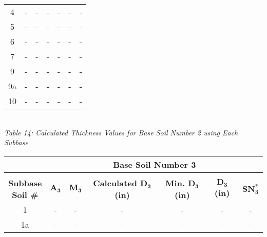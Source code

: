 \documentclass{article}
\begin{document}
\begin{center}
\begin{spacing}{1.6}
\begin{tabular}{|c|cccccc|}
                                            4       & -     & -    & -    & -                    & -              & -               \\
                                            5       & -     & -    & -    & -                    & -              & -               \\
                                            6       & -     & -    & -    & -                    & -              & -               \\
                                            7       & -     & -    & -    & -                    & -              & -               \\
                                            9       & -     & -    & -    & -                    & -              & -               \\
                                            9a      & -     & -    & -    & -                    & -              & -               \\
                                            10      & -     & -    & -    & -                    & -              & -               \\\hline
        \end{tabular}
        \vspace{3mm}
        \emph{\\Table 14: Calculated Thickness Values for Base Soil Number 2 using Each Subbase\\}
        \newpage
        \begin{tabular}{|c|cccccc|}
            \hline    
            \multicolumn{1}{|l}{}                     & \multicolumn{6}{c|}{\textbf{Base Soil Number 3}}                                              \\\hline
            &&&&&&\\
             \shortstack[c]{\textbf{Subbase}\\\textbf{Soil \#}} & $\bm{A_3}$ & $\bm{M_3}$  & \textbf{Calculated $\bm{D_3}$ (in)} & \textbf{Min. $\bm{D_3}$ (in)} & \textbf{$\bm{D_3}$ (in)} & $\bm{SN_3^*}$  \\\hline
                                            1       & -     & -    & -    & -                    & -              & -               \\
                                            1a      & -     & -    & -    & -                    & -              & -               \\

\end{tabular}
\end{spacing}
\end{center}
\end{document}
